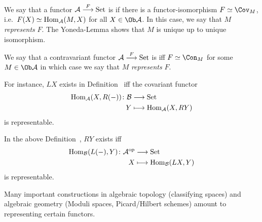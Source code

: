 \documentclass[a4paper,parskip=half,numbers=enddot, DIV=12]{scrreprt}
\begin{document}
  \begin{defi}
  	\begin{alphanumerate}
  		\item We say that a functor $\Aa\morphism[F] \cat{Set}$ is  if there is a functor-isomorphism $F\simeq \Cov_M$, i.e.\ $F(X) \simeq \operatorname{Hom}_{\mathcal{A}}(M,X)$ for all $X\in\Ob\Aa$. In this case, we say that $M$ \emph{represents} $F$. The Yoneda-Lemma shows that $M$ is unique up to unique isomorphism.
  		\item We say that a contravariant functor $\Aa\morphism[F]\cat{Set}$ is  iff $F\simeq \Con_M$ for some $M\in\Ob\Aa$ in which case we say that $M$ \emph{represents} $F$.
  	\end{alphanumerate}
  \end{defi}
  \begin{rem*}
  	\begin{alphanumerate}
  		\item  For instance, $LX$ exists in Definition~ iff the covariant functor 
  		\begin{align*}
  		\Hom_\Aa(X,R(-))\colon\Bb&\morphism\cat{Set}\\
  		Y &\longmapsto \Hom_\Aa(X, RY)
  		\end{align*}
  		is representable.
  		\item
  		In the above Definition~, $RY$ exists iff 
  		\begin{align*}
  		\Hom_\Bb(L(-), Y)\colon\Aa^\op&\morphism\cat{Set}\\
  		X&\longmapsto \Hom_\Bb(LX,Y)
  		\end{align*}
  		is representable.
  		\item 
  		Many important constructions in algebraic topology (classifying spaces) and algebraic geometry (Moduli spaces, Picard/Hilbert schemes) amount to representing certain functors.
  	\end{alphanumerate}
  \end{rem*}
\end{document}
